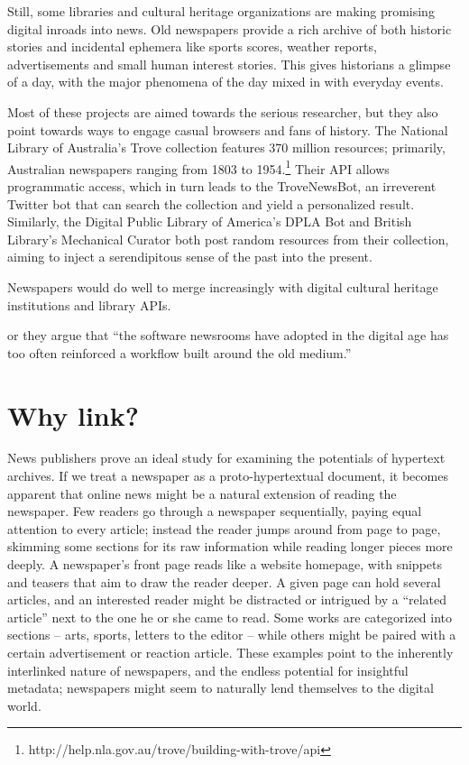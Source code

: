 Still, some libraries and cultural heritage organizations are making promising digital inroads into news. Old newspapers provide a rich archive of both historic stories and incidental ephemera like sports scores, weather reports, advertisements and small human interest stories. This gives historians a glimpse of a day, with the major phenomena of the day mixed in with everyday events.

Most of these projects are aimed towards the serious researcher, but they also point towards ways to engage casual browsers and fans of history. The National Library of Australia's Trove collection features 370 million resources; primarily, Australian newspapers ranging from 1803 to 1954.\footnote{http://help.nla.gov.au/trove/building-with-trove/api} Their API allows programmatic access, which in turn leads to the TroveNewsBot, an irreverent Twitter bot that can search the collection and yield a personalized result. Similarly, the Digital Public Library of America's DPLA Bot and British Library's Mechanical Curator both post random resources from their collection, aiming to inject a serendipitous sense of the past into the present.

Newspapers would do well to merge increasingly with digital cultural heritage institutions and library APIs. 

or they argue that ``the software newsrooms have adopted in the digital age has too often reinforced a workflow built around the old medium.''


\section{Why link?}

News publishers prove an ideal study for examining the potentials of hypertext archives. If we treat a newspaper as a proto-hypertextual document, it becomes apparent that online news might be a natural extension of reading the newspaper. Few readers go through a newspaper sequentially, paying equal attention to every article; instead the reader jumps around from page to page, skimming some sections for its raw information while reading longer pieces more deeply. A newspaper's front page reads like a website homepage, with snippets and teasers that aim to draw the reader deeper. A given page can hold several articles, and an interested reader might be distracted or intrigued by a ``related article'' next to the one he or she came to read. Some works are categorized into sections -- arts, sports, letters to the editor -- while others might be paired with a certain advertisement or reaction article. These examples point to the inherently interlinked nature of newspapers, and the endless potential for insightful metadata; newspapers might seem to naturally lend themselves to the digital world.

